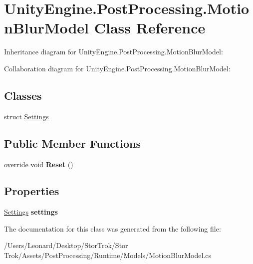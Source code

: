 \hypertarget{class_unity_engine_1_1_post_processing_1_1_motion_blur_model}{}\section{Unity\+Engine.\+Post\+Processing.\+Motion\+Blur\+Model Class Reference}
\label{class_unity_engine_1_1_post_processing_1_1_motion_blur_model}


Inheritance diagram for Unity\+Engine.\+Post\+Processing.\+Motion\+Blur\+Model\+:


Collaboration diagram for Unity\+Engine.\+Post\+Processing.\+Motion\+Blur\+Model\+:
\subsection*{Classes}
\begin{DoxyCompactItemize}
\item 
struct \hyperlink{struct_unity_engine_1_1_post_processing_1_1_motion_blur_model_1_1_settings}{Settings}
\end{DoxyCompactItemize}
\subsection*{Public Member Functions}
\begin{DoxyCompactItemize}
\item 
\mbox{\label{class_unity_engine_1_1_post_processing_1_1_motion_blur_model_a04196279454910f3f9c840378a80b8c7}} 
override void {\bfseries Reset} ()
\end{DoxyCompactItemize}
\subsection*{Properties}
\begin{DoxyCompactItemize}
\item 
\mbox{\label{class_unity_engine_1_1_post_processing_1_1_motion_blur_model_ac570d8bef9ee96c2728292da1aff5af3}} 
\hyperlink{struct_unity_engine_1_1_post_processing_1_1_motion_blur_model_1_1_settings}{Settings} {\bfseries settings}
\end{DoxyCompactItemize}


The documentation for this class was generated from the following file\+:\begin{DoxyCompactItemize}
\item 
/\+Users/\+Leonard/\+Desktop/\+Stor\+Trok/\+Stor Trok/\+Assets/\+Post\+Processing/\+Runtime/\+Models/Motion\+Blur\+Model.\+cs\end{DoxyCompactItemize}
